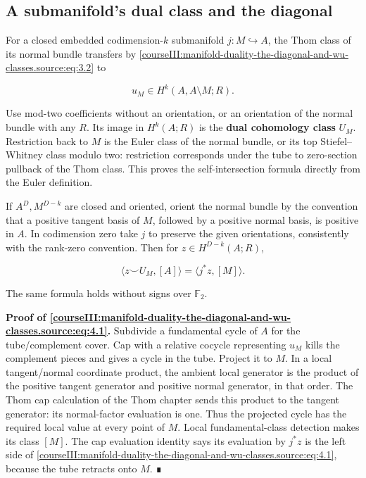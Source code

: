 \subsection{A submanifold's dual class and the diagonal}
\label{courseIII:manifold-duality-the-diagonal-and-wu-classes.source:section-4}

For a closed embedded codimension-\(k\) submanifold \(j:M\hookrightarrow A\), the Thom class of its normal bundle transfers by \eqref{courseIII:manifold-duality-the-diagonal-and-wu-classes.source:eq:3.2} to

\[
u_M\in H^k(A,A\setminus M;R).
\]

Use mod-two coefficients without an orientation, or an orientation of the normal bundle with any \(R\). Its image in \(H^k(A;R)\) is the \textbf{dual cohomology class} \(U_M\). Restriction back to \(M\) is the Euler class of the normal bundle, or its top Stiefel--Whitney class modulo two: restriction corresponds under the tube to zero-section pullback of the Thom class. This proves the self-intersection formula directly from the Euler definition.

If \(A^D,M^{D-k}\) are closed and oriented, orient the normal bundle by the convention that a positive tangent basis of \(M\), followed by a positive normal basis, is positive in \(A\). In codimension zero take \(j\) to preserve the given orientations, consistently with the rank-zero convention. Then for \(z\in H^{D-k}(A;R)\),

\begin{equation}
\langle z\smile U_M,[A]\rangle=\langle j^*z,[M]\rangle.
\label{courseIII:manifold-duality-the-diagonal-and-wu-classes.source:eq:4.1}
\end{equation}

The same formula holds without signs over \(\mathbb F _2\).

\textbf{Proof of \eqref{courseIII:manifold-duality-the-diagonal-and-wu-classes.source:eq:4.1}.} Subdivide a fundamental cycle of \(A\) for the tube/complement cover. Cap with a relative cocycle representing \(u_M\) kills the complement pieces and gives a cycle in the tube. Project it to \(M\). In a local tangent/normal coordinate product, the ambient local generator is the product of the positive tangent generator and positive normal generator, in that order. The Thom cap calculation of the Thom chapter sends this product to the tangent generator: its normal-factor evaluation is one. Thus the projected cycle has the required local value at every point of \(M\). Local fundamental-class detection makes its class \([M]\). The cap evaluation identity says its evaluation by \(j^*z\) is the left side of \eqref{courseIII:manifold-duality-the-diagonal-and-wu-classes.source:eq:4.1}, because the tube retracts onto \(M\). ∎

